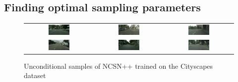 \subsection{Finding optimal sampling parameters}


%
\begin{figure} \label{fig:5.5}
    \tiny
    \centering
    \setlength\tabcolsep{-2pt}
    \begin{tabular}{ccc}
        \includegraphics[width=0.33\textwidth]{Chapters/figures/experiments/cityscapes/1_uncond_sample.png} & 
        \includegraphics[width=0.33\textwidth]{Chapters/figures/experiments/cityscapes/3_uncond_sample.png} & 
        \includegraphics[width=0.33\textwidth]{Chapters/figures/experiments/cityscapes/8_uncond_sample.png}\\
        \includegraphics[width=0.33\textwidth]{Chapters/figures/experiments/cityscapes/6_uncond_sample.png} & 
        \includegraphics[width=0.33\textwidth]{Chapters/figures/experiments/cityscapes/10_uncond_sample.png} & 
        \includegraphics[width=0.33\textwidth]{Chapters/figures/experiments/cityscapes/18_uncond_sample.png} 
    \end{tabular}
    \caption{Unconditional samples of NCSN++ trained on the Cityscapes dataset}
\end{figure}

